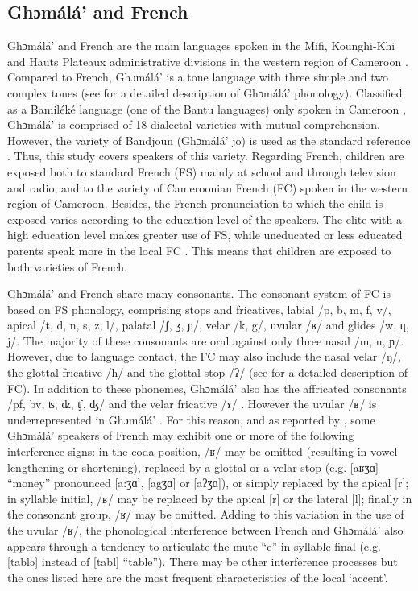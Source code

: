 \documentclass[output=paper,newtxmath,modfonts,nonflat,draftmode]{langsci/langscibook}
\begin{document}
\subsection{Ghɔmálá’ and French} %

Ghɔmálá’ and French are the main languages spoken in the Mifi, Kounghi-Khi and Hauts Plateaux administrative divisions in the western region of Cameroon \citep{Breton1991}. Compared to French, Ghɔmálá’ is a tone language with three simple and two complex tones (see \citet{Nissim1981} for a detailed description of Ghɔmálá’ phonology). Classified as a Bamiléké language (one of the Bantu languages) only spoken in Cameroon \citep{Dieu1983}, Ghɔmálá’ is comprised of 18 dialectal varieties with mutual comprehension. However, the variety of Bandjoun (Ghɔmálá’ jo) is used as the standard reference \citep{Domche1991}. Thus, this study covers speakers of this variety. Regarding French, children are exposed both to standard French (FS) mainly at school and through television and radio, and to the variety of Cameroonian French (FC) spoken in the western region of Cameroon. Besides, the French pronunciation to which the child is exposed varies according to the education level of the speakers. The elite with a high education level makes greater use of FS, while uneducated or less educated parents speak more in the local FC \citep{Biloa2004}. This means that children are exposed to both varieties of French. 

Ghɔmálá’ and French share many consonants. The consonant system of FC is based on FS phonology, comprising stops and fricatives, labial /p, b, m, f, v/, apical /t, d, n, s, z, l/, palatal /ʃ, ʒ, ɲ/, velar /k, g/, uvular /ʁ/ and glides /w, ɥ, j/. The majority of these consonants are oral against only three nasal /m, n, ɲ/. However, due to language contact, the FC may also include the nasal velar /ŋ/, the glottal fricative /h/ and the glottal stop /ʔ/ (see \citet{Biloa2004} for a detailed description of FC). In addition to these phonemes, Ghɔmálá’ also has the affricated consonants /pf, bv, ʦ, ʣ, ʧ, ʤ/ and the velar fricative /ɤ/ \citep{Mba1995}. However the uvular /ʁ/ is underrepresented in Ghɔmálá’ \citep{Mba1995}. For this reason, and as reported by \citet{Biloa2004}, some Ghɔmálá’ speakers of French may exhibit one or more of the following interference signs: in the coda position, /ʁ/ may be omitted (resulting in vowel lengthening or shortening), replaced by a glottal or a velar stop (e.g. [aʁʒɑ] “money” pronounced [a:ʒɑ], [agʒɑ] or [aʔʒɑ]), or simply replaced by the apical [r]; in syllable initial, /ʁ/ may be replaced by the apical [r] or the lateral [l]; finally in the consonant group, /ʁ/ may be omitted. Adding to this variation in the use of the uvular /ʁ/, the phonological interference between French and Ghɔmálá’ also appears through a tendency to articulate the mute “e” in syllable final (e.g. [tablə] instead of [tabl] “table”). There may be other interference processes but the ones listed here are the most frequent characteristics of the local ‘accent’. 
\end{document}
